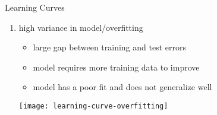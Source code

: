 \begin{frame}[c,allowframebreaks]{Learning Curves}
\begin{enumerate}
    \begin{center}
    \texttt{[image: learning-curve-underfitting]}
    \end{center}

    \framebreak

    \item high variance in model/overfitting
    \begin{itemize}
    \item large gap between training and test errors
    \item model requires more training data to improve
    \item model has a poor fit and does not generalize well
    \end{itemize}

    \begin{center}
    \texttt{[image: learning-curve-overfitting]}
    \end{center}

    \end{enumerate}
    \end{frame}


